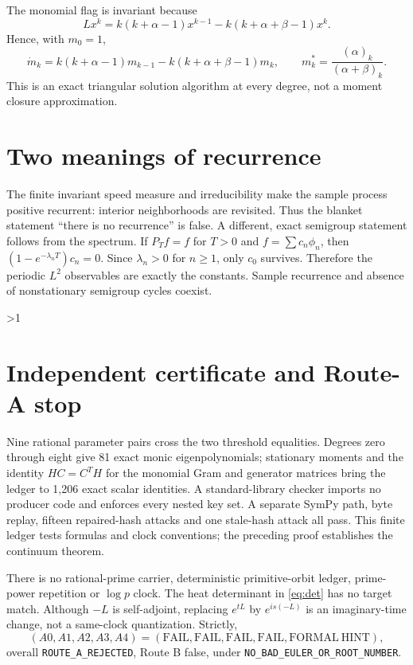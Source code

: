 \documentclass[9pt]{extarticle}
\begin{document}
The monomial flag is invariant because
\begin{equation}\label{eq:mom}
 Lx^k=k(k+\alpha-1)x^{k-1}-k(k+\alpha+\beta-1)x^k.
\end{equation}
Hence, with $m_0=1$,
\[
 \dot m_k=k(k+\alpha-1)m_{k-1}-k(k+\alpha+\beta-1)m_k,
 \qquad m_k^*=\frac{(\alpha)_k}{(\alpha+\beta)_k}.
\]
This is an exact triangular solution algorithm at every degree, not a moment
closure approximation.

\section{Two meanings of recurrence}
The finite invariant speed measure and irreducibility make the sample process
positive recurrent: interior neighborhoods are revisited.  Thus the blanket
statement ``there is no recurrence'' is false.  A different, exact semigroup
statement follows from the spectrum.  If $P_Tf=f$ for $T>0$ and
$f=\sum c_n\phi_n$, then
$(1-e^{-\lambda_nT})c_n=0$.  Since $\lambda_n>0$ for $n\ge1$, only $c_0$
survives.  Therefore the periodic $L^2$ observables are exactly the constants.
Sample recurrence and absence of nonstationary semigroup cycles coexist.
\fi

\ifnum\CRevisionRound>1
\section{Independent certificate and Route-A stop}
Nine rational parameter pairs cross the two threshold equalities.  Degrees
zero through eight give 81 exact monic eigenpolynomials; stationary moments
and the identity $HC=C^TH$ for the monomial Gram and generator matrices bring
the ledger to 1,206 exact scalar identities.  A standard-library checker
imports no producer code and enforces every nested key set.  A separate SymPy
path, byte replay, fifteen repaired-hash attacks and one stale-hash attack all
pass.  This finite ledger tests formulas and clock conventions; the preceding
proof establishes the continuum theorem.

There is no rational-prime carrier, deterministic primitive-orbit ledger,
prime-power repetition or $\log p$ clock.  The heat determinant in
\eqref{eq:det} has no target match.  Although $-L$ is self-adjoint, replacing
$e^{tL}$ by $e^{is(-L)}$ is an imaginary-time change, not a same-clock
quantization.  Strictly,
\[
 (A0,A1,A2,A3,A4)=(\mathrm{FAIL},\mathrm{FAIL},\mathrm{FAIL},
 \mathrm{FAIL},\mathrm{FORMAL\ HINT}),
\]
overall \texttt{ROUTE\_A\_REJECTED}, Route B false, under
\texttt{NO\_BAD\_EULER\_OR\_ROOT\_NUMBER}.
\end{document}
